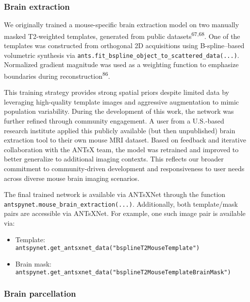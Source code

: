 \documentclass[
  12pt,
]{article}
\providecommand{\tightlist}{%
  \setlength{\itemsep}{0pt}\setlength{\parskip}{0pt}}
\begin{document}
\subsubsection{Brain extraction}\label{brain-extraction}

We originally trained a mouse-specific brain extraction model on two
manually masked T2-weighted templates, generated from public
datasets\textsuperscript{67,68}. One of the templates was constructed
from orthogonal 2D acquisitions using B-spline--based volumetric
synthesis via
\texttt{ants.fit\_bspline\_object\_to\_scattered\_data(...)}. Normalized
gradient magnitude was used as a weighting function to emphasize
boundaries during reconstruction\textsuperscript{86}.

This training strategy provides strong spatial priors despite limited
data by leveraging high-quality template images and aggressive
augmentation to mimic population variability. During the development of
this work, the network was further refined through community engagement.
A user from a U.S.-based research institute applied this publicly
available (but then unpublished) brain extraction tool to their own
mouse MRI dataset. Based on feedback and iterative collaboration with
the ANTsX team, the model was retrained and improved to better
generalize to additional imaging contexts. This reflects our broader
commitment to community-driven development and responsiveness to user
needs across diverse mouse brain imaging scenarios.

The final trained network is available via ANTsXNet through the
function\\
\texttt{antspynet.mouse\_brain\_extraction(...)}. Additionally, both
template/mask pairs are accessible via ANTsXNet. For example, one such
image pair is available via:

\begin{itemize}
\tightlist
\item
  Template:\\
  \texttt{antspynet.get\_antsxnet\_data("bsplineT2MouseTemplate")}
\item
  Brain mask:\\
  \texttt{antspynet.get\_antsxnet\_data("bsplineT2MouseTemplateBrainMask")}
\end{itemize}

\subsubsection{Brain parcellation}\label{brain-parcellation}
\end{document}
